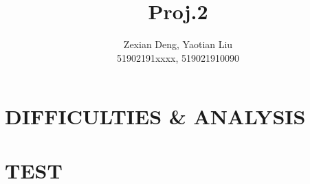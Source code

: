 \documentclass[conference]{IEEEtran}
\begin{document}
\title{Proj.2}

\author{Zexian Deng, Yaotian Liu \\  51902191xxxx, 519021910090}
\date{}

\maketitle



\section{DIFFICULTIES \& ANALYSIS}









\section{TEST}



\printbibliography
\end{document}
